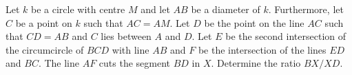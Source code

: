 Let $k$ be a circle with centre $M$ and let $AB$ be a diameter of $k$.
Furthermore, let $C$ be a point on $k$ such that $AC = AM$.
Let $D$ be the point on the line $AC$ such that $CD = AB$ and $C$ lies between $A$ and $D$.
Let $E$ be the second intersection of the circumcircle of $BCD$ with line $AB$
and $F$ be the intersection of the lines $ED$ and $BC$.
The line $AF$ cuts the segment $BD$ in $X$.
Determine the ratio $BX/XD$.
